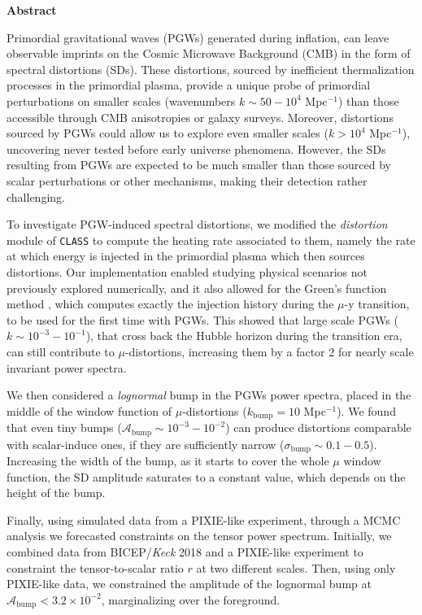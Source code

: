 \vspace*{10pt}
\begin{center}
	\large\textbf{Abstract}\normalsize
\end{center}
\vspace*{10pt}
\begin{adjustwidth}{1cm}{1cm}
Primordial gravitational waves (PGWs) generated during inflation, can leave observable imprints on
the Cosmic Microwave Background (CMB) in the form of spectral distortions (SDs). These distortions,
sourced by inefficient thermalization processes in the primordial plasma, provide a unique probe of
primordial perturbations on smaller scales (wavenumbers $k \sim 50 - 10^{4}$ Mpc$^{-1}$) than those accessible
through CMB anisotropies or galaxy surveys. Moreover, distortions sourced by PGWs could allow us to
explore even smaller scales ($k > 10^{4}$ Mpc$^{-1}$), uncovering never tested before early universe phenomena. However, the SDs resulting from PGWs are expected to be much smaller than those sourced by scalar perturbations or other mechanisms, making their detection rather challenging.

To investigate PGW-induced spectral distortions, we modified the \emph{distortion} module of \texttt{\texttt{CLASS}} to compute the heating rate associated to them, namely the rate at which energy is injected in the primordial plasma which then sources distortions. Our implementation enabled studying physical
scenarios not previously explored numerically, and it also allowed for the Green’s function method \cite{Chluba_Green}, which computes exactly the injection history during the $\mu$-y transition, to be used for the first time with PGWs. This showed that large scale PGWs ($k\sim 10^{-3}-10^{-1}$), that cross back the Hubble horizon during the transition era, can still contribute to $\mu$-distortions, increasing them by a factor 2 for nearly scale invariant power spectra.

We then considered a \emph{lognormal} bump in the PGWs power spectra, placed in the middle of the window function of $\mu$-distortions ($k_\text{bump}=10$ Mpc$^{-1}$). We found that even tiny bumps ($\mathcal{A}_\text{bump}\sim 10^{-3}-10^{-2}$) can produce distortions comparable with scalar-induce ones, if they are sufficiently narrow ($\sigma_\text{bump}\sim 0.1-0.5$). Increasing the width of the bump, as it starts to cover the whole $\mu$ window function, the SD amplitude saturates to a constant value, which depends on the height of the bump. 

Finally, using simulated data from a PIXIE-like experiment, through a MCMC analysis we forecasted constraints on the tensor power spectrum. Initially, we combined data from BICEP/\textit{Keck} 2018 and a PIXIE-like experiment to constraint the tensor-to-scalar ratio $r$ at two different scales. Then, using only PIXIE-like data, we constrained the amplitude of the lognormal bump at $\mathcal{A}_\text{bump}<3.2\times10^{-2}$, marginalizing over the foreground.


\end{adjustwidth}